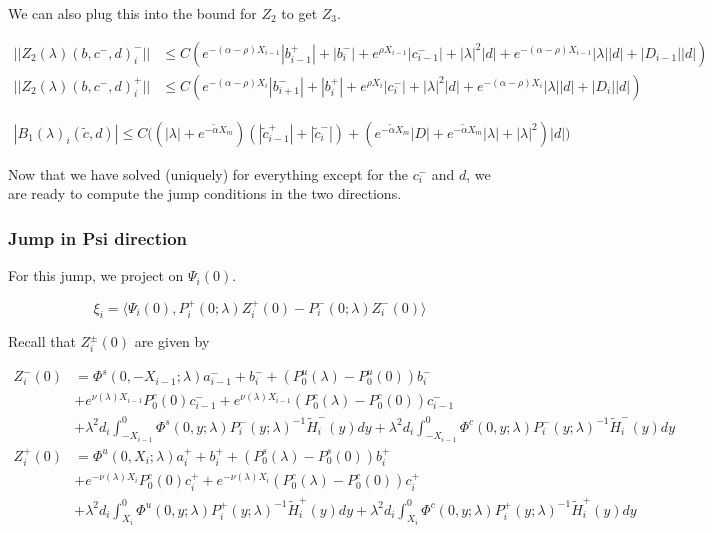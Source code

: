 \documentclass[12pt]{article}
\begin{document}
We can also plug this into the bound for $Z_2$ to get $Z_3$.

\begin{align*}
||Z_2(\lambda)(b,c^-,d)_i^-|| &\leq C ( e^{-(\alpha - \rho) X_{i-1}} |b_{i-1}^+| + |b_i^-| + e^{\rho X_{i-1}}|c_{i-1}^-| + |\lambda|^2 |d| + e^{-(\alpha - \rho)X_{i-1}}|\lambda||d| + |D_{i-1}||d| ) \\
||Z_2(\lambda)(b,c^-,d)_i^+|| &\leq C ( e^{-(\alpha - \rho) X_i}|b_{i+1}^-| + |b_i^+| + e^{\rho X_i} |c_i^-| + |\lambda|^2 |d| + e^{-(\alpha - \rho)X_i}|\lambda||d| + |D_i||d| )
\end{align*}

\begin{align*}
|B_1(\lambda)_i(\tilde{c}, d)| \leq C\Big( 
(|\lambda| + e^{-\tilde{\alpha}X_m})( |\tilde{c}_{i-1}^+| + |\tilde{c}_i^-|)
+ ( e^{-\tilde{\alpha}X_m} |D| + e^{-\tilde{\alpha}X_m}|\lambda| + |\lambda|^2)|d| \Big)
\end{align*}


Now that we have solved (uniquely) for everything except for the $c_i^-$ and $d$, we are ready to compute the jump conditions in the two directions.

\subsubsection*{Jump in Psi direction}

For this jump, we project on $\Psi_i(0)$.

\[
\xi_i = \langle \Psi_i(0), P_i^+(0; \lambda) Z_i^+(0) - P_i^-(0; \lambda) Z_i^-(0) \rangle
\]

Recall that $Z_i^\pm(0)$ are given by

\begin{align*}
Z_i^-(0) &= \Phi^s(0, -X_{i-1}; \lambda) a_{i-1}^- + b_i^- + (P_0^u(\lambda) - P_0^u(0))b_i^- \\
&+ e^{\nu(\lambda) X_{i-1}} P_0^c(0) c_{i-1}^- + e^{\nu(\lambda) X_{i-1}} (P_0^c(\lambda) - P_0^c(0))c_{i-1}^- \\
&+ \lambda^2 d_i \int_{-X_{i-1}}^0 \Phi^s(0, y; \lambda) P_i^-(y; \lambda)^{-1} \tilde{H}_i^-(y) dy 
+ \lambda^2 d_i \int_{-X_{i-1}}^0 \Phi^c(0, y; \lambda) P_i^-(y; \lambda)^{-1} \tilde{H}_i^-(y) dy  \\ 
Z_i^+(0) &= \Phi^u(0, X_i; \lambda) a_i^+ + b_i^+ + (P_0^s(\lambda) - P_0^s(0)) b_i^+ \\
&+ e^{-\nu(\lambda)X_i} P_0^c(0) c_i^+ + e^{-\nu(\lambda)X_i} (P_0^c(\lambda) - P_0^c(0))c_i^+ \\
&+ \lambda^2 d_i \int_{X_i}^0 \Phi^u(0, y; \lambda) P_i^+(y; \lambda)^{-1} \tilde{H}_i^+(y) dy 
+ \lambda^2 d_i \int_{X_i}^0 \Phi^c(0, y; \lambda) P_i^+(y; \lambda)^{-1} \tilde{H}_i^+(y) dy \\
\end{align*}
\end{document}
